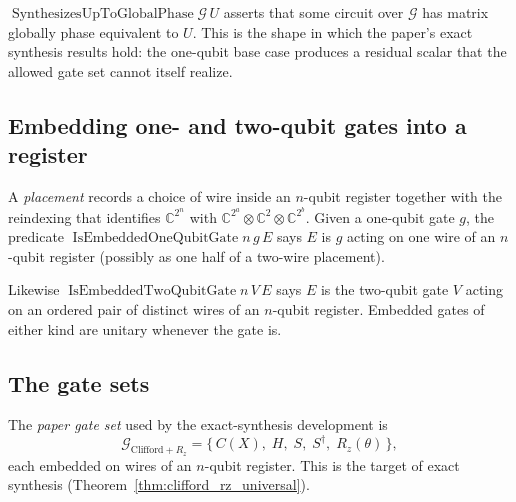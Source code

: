 \begin{definition}
  \label{def:synthesizes_phase}
  \leanok
  $\operatorname{SynthesizesUpToGlobalPhase} \mathcal{G}\, U$ asserts that
  some circuit over $\mathcal{G}$ has matrix globally phase equivalent to $U$.
  This is the shape in which the paper's exact synthesis results hold: the
  one-qubit base case produces a residual scalar that the allowed gate set
  cannot itself realize.
\end{definition}

\subsection{Embedding one- and two-qubit gates into a register}

\begin{definition}
  \label{def:embedded_one}
  \leanok
  A \emph{placement} records a choice of wire inside an $n$-qubit register
  together with the reindexing that identifies
  $\mathbb{C}^{2^n}$ with $\mathbb{C}^{2^a} \otimes \mathbb{C}^{2}
  \otimes \mathbb{C}^{2^b}$.  Given a one-qubit gate $g$, the predicate
  $\operatorname{IsEmbeddedOneQubitGate} n\, g\, E$ says $E$ is $g$ acting on
  one wire of an $n$-qubit register (possibly as one half of a two-wire
  placement).
\end{definition}

\begin{definition}
  \label{def:embedded_two}
  \leanok
  Likewise $\operatorname{IsEmbeddedTwoQubitGate} n\, V\, E$ says $E$ is the
  two-qubit gate $V$ acting on an ordered pair of distinct wires of an
  $n$-qubit register.  Embedded gates of either kind are unitary whenever the
  gate is.
\end{definition}

\subsection{The gate sets}

\begin{definition}
  \label{def:gate_cliffordrz}
  \leanok
  The \emph{paper gate set} used by the exact-synthesis development is
  \[
    \mathcal{G}_{\mathrm{Clifford}+R_z}
      = \{\, C(X),\; H,\; S,\; S^\dagger,\; R_z(\theta) \,\},
  \]
  each embedded on wires of an $n$-qubit register.  This is the target of
  exact synthesis (Theorem~\ref{thm:clifford_rz_universal}).
\end{definition}

